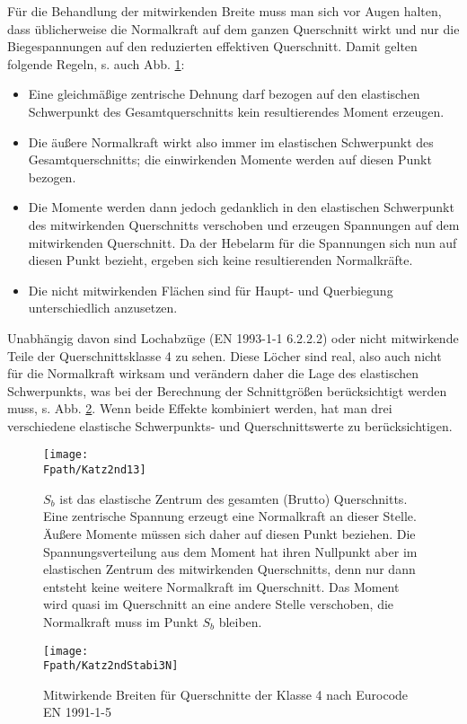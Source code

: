 F\"{u}r die Behandlung der mitwirkenden Breite muss man sich vor Augen halten, dass \"{u}blicherweise die Normalkraft auf dem ganzen Querschnitt wirkt und nur die Biegespannungen auf den reduzierten effektiven Querschnitt. Damit gelten folgende Regeln, s. auch Abb. \ref{Katz2nd13}:\\
\begin{itemize}
  \item Eine gleichm\"{a}{\ss}ige zentrische Dehnung darf bezogen auf den elastischen Schwerpunkt des Gesamtquerschnitts kein resultierendes Moment erzeugen.
  \item Die \"{a}u{\ss}ere Normalkraft wirkt also immer im elastischen Schwerpunkt des Gesamtquerschnitts; die einwirkenden Momente werden auf diesen Punkt bezogen.
  \item Die Momente werden dann jedoch gedanklich in den elastischen Schwerpunkt des mitwirkenden Querschnitts verschoben und erzeugen Spannungen auf dem mitwirkenden Querschnitt. Da der Hebelarm f\"{u}r die Spannungen sich nun auf diesen Punkt bezieht, ergeben sich keine resultierenden Normalkr\"{a}fte.
  \item Die nicht mitwirkenden Fl\"{a}chen sind f\"{u}r Haupt- und Querbiegung unterschiedlich anzusetzen.
\end{itemize}
Unabh\"{a}ngig davon sind Lochabz\"{u}ge (EN 1993-1-1 6.2.2.2) oder nicht mitwirkende Teile der Querschnittsklasse 4 zu sehen. Diese L\"{o}cher sind real, also auch nicht f\"{u}r die Normalkraft wirksam und ver\"{a}ndern daher die Lage des elastischen Schwerpunkts, was bei der Berechnung der Schnittgr\"{o}{\ss}en ber\"{u}cksichtigt werden muss, s. Abb. \ref{Katz2ndStabi3}. Wenn beide Effekte kombiniert werden, hat man drei verschiedene elastische Schwerpunkts- und Querschnittswerte zu ber\"{u}cksichtigen.

\begin{figure}[tbp] \centering
\centering
\if {} \sidecaption[t] \fi
\texttt{[image: \\Fpath/Katz2nd13]}
\caption{$S_b$ ist das elastische Zentrum des gesamten (Brutto) Querschnitts. Eine zentrische Spannung erzeugt eine Normalkraft an dieser Stelle. \"{A}u{\ss}ere Momente m\"{u}ssen sich daher auf diesen Punkt beziehen. Die Spannungsverteilung aus dem Moment hat ihren Nullpunkt aber im elastischen Zentrum des mitwirkenden Querschnitts, denn nur dann entsteht keine weitere Normalkraft im Querschnitt. Das Moment wird quasi im Querschnitt an eine andere Stelle verschoben, die Normalkraft muss im Punkt $S_b$ bleiben.} \label{Katz2nd13}
\end{figure}%
\begin{figure}[tbp] \centering
\centering
\if {} \sidecaption[t] \fi
\texttt{[image: \\Fpath/Katz2ndStabi3N]}
\caption{Mitwirkende Breiten f\"{u}r Querschnitte der Klasse 4 nach Eurocode EN 1991-1-5} \label{Katz2ndStabi3}
\end{figure}%


